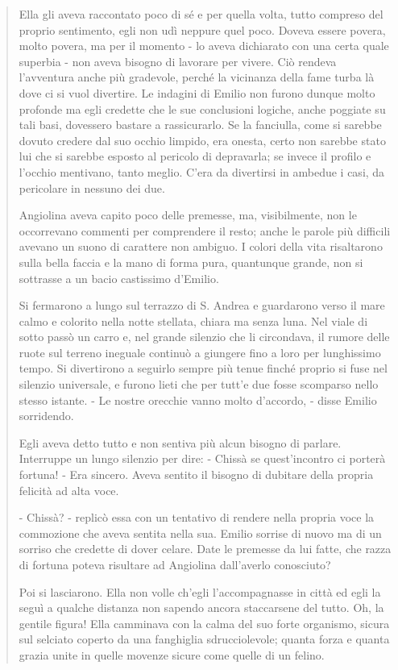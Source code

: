 \documentclass[a4paper, twoside, titlepage]{book}
\newcounter{mar}
\begin{document}
\begin{quotation}
Ella gli aveva raccontato poco di sé e per quella volta, tutto compreso del proprio sentimento, egli non udì neppure quel poco. Doveva essere povera, molto povera, ma per il momento - lo aveva dichiarato con una certa quale superbia - non aveva bisogno di lavorare per vivere. Ciò rendeva l’avventura anche più gradevole, perché la vicinanza della fame turba là dove ci si vuol divertire. Le indagini di Emilio non furono dunque molto profonde ma egli credette che le sue conclusioni logiche, anche poggiate su tali basi, dovessero bastare a rassicurarlo. Se la fanciulla, come si sarebbe dovuto credere dal suo occhio limpido, era onesta, certo non sarebbe stato lui che si sarebbe esposto al pericolo di depravarla; se invece il profilo e l’occhio mentivano, tanto meglio. C’era da divertirsi in ambedue i casi, da pericolare in nessuno dei due.

Angiolina aveva capito poco delle premesse, ma, visibilmente, non le occorrevano commenti per comprendere il resto; anche le parole più difficili avevano un suono di carattere non ambiguo. I colori della vita risaltarono sulla bella faccia e la mano di forma pura, quantunque grande, non si sottrasse a un bacio castissimo d’Emilio.

Si fermarono a lungo sul terrazzo di S. Andrea e guardarono verso il mare calmo e colorito nella notte stellata, chiara ma senza luna. Nel viale di sotto passò un carro e, nel grande silenzio che li circondava, il rumore delle ruote sul terreno ineguale continuò a giungere fino a loro per lunghissimo tempo. Si divertirono a seguirlo sempre più tenue finché proprio si fuse nel silenzio universale, e furono lieti che per tutt’e due fosse scomparso nello stesso istante. - Le nostre orecchie vanno molto d’accordo, - disse Emilio sorridendo.

Egli aveva detto tutto e non sentiva più alcun bisogno di parlare. Interruppe un lungo silenzio per dire: - Chissà se quest’incontro ci porterà fortuna! - Era sincero. Aveva sentito il bisogno di dubitare della propria felicità ad alta voce.

- Chissà? - replicò essa con un tentativo di rendere nella propria voce la commozione che aveva sentita nella sua. Emilio sorrise di nuovo ma di un sorriso che credette di dover celare. Date le premesse da lui fatte, che razza di fortuna poteva risultare ad Angiolina dall’averlo conosciuto?

Poi si lasciarono. Ella non volle ch’egli l’accompagnasse in città ed egli la seguì a qualche distanza non sapendo ancora staccarsene del tutto. Oh, la gentile figura! Ella camminava con la calma del suo forte organismo, sicura sul selciato coperto da una fanghiglia sdrucciolevole; quanta forza e quanta grazia unite in quelle movenze sicure come quelle di un felino.
\end{quotation}
\end{document}
